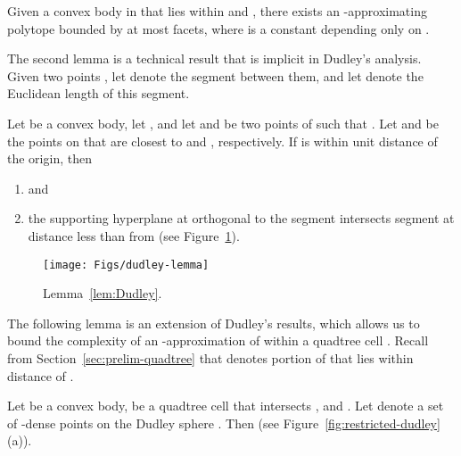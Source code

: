 \documentclass[11pt]{article}   \usepackage[letterpaper,hmargin=2.1cm,vmargin=3cm]{geometry}
\begin{document}
\begin{lemma} \label{lem:Dudley1}
Given a convex body  in  that lies within  and , there exists an -approximating polytope  bounded by at most  facets, where  is a constant depending only on .
\end{lemma}


The second lemma is a technical result that is implicit in Dudley's analysis. Given two points , let  denote the segment between them, and let  denote the Euclidean length of this segment.

\begin{lemma} \label{lem:Dudley}
Let  be a convex body, let , and let  and  be two points of  such that . Let  and  be the points on  that are closest to  and , respectively. If  is within unit distance of the origin, then
\begin{enumerate}
\item[]  and

\item[] the supporting hyperplane at  orthogonal to the segment  intersects segment  at distance less than  from  (see Figure~\ref{fig:dudley-lemma}).
\end{enumerate}
\end{lemma}


\begin{figure}[htbp]
  \centerline{\texttt{[image: Figs/dudley-lemma]}}
  \caption{Lemma~\ref{lem:Dudley}.}
  \label{fig:dudley-lemma}
\end{figure}


The following lemma is an extension of Dudley's results, which allows us to bound the complexity of an -approximation of  within a quadtree cell . Recall from Section~\ref{sec:prelim-quadtree} that  denotes portion of  that lies within distance  of . 

\begin{lemma} \label{lem:restricted-dudley}
Let  be a convex body,  be a quadtree cell that intersects , and . Let  denote a set of -dense points on the Dudley sphere . Then  (see Figure~\ref{fig:restricted-dudley}(a)).
\end{lemma}
\end{document}
